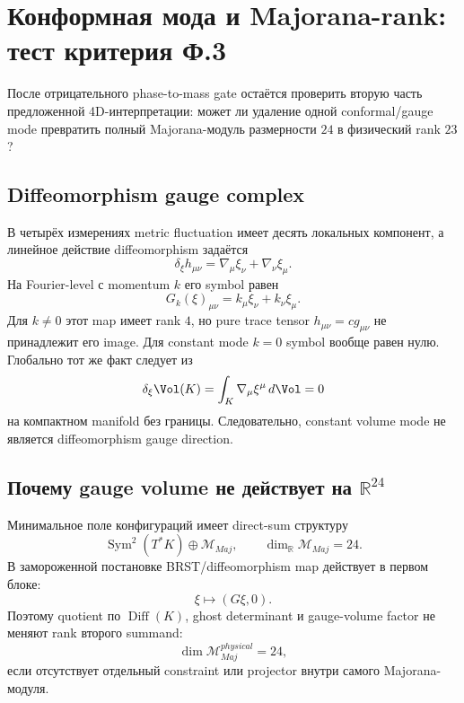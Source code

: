\chapter{Конформная мода и Majorana-rank: тест критерия Ф.3}

После отрицательного phase-to-mass gate остаётся проверить вторую часть
предложенной 4D-интерпретации: может ли удаление одной conformal/gauge mode
превратить полный Majorana-модуль размерности \(24\) в физический rank \(23\)?

\section{Diffeomorphism gauge complex}

В четырёх измерениях metric fluctuation имеет десять локальных компонент,
а линейное действие diffeomorphism задаётся
\begin{equation}
 \delta_\xi h_{\mu\nu}=\nabla_\mu\xi_\nu+\nabla_\nu\xi_\mu.
\end{equation}
На Fourier-level с momentum \(k\) его symbol равен
\begin{equation}
 G_k(\xi)_{\mu\nu}=k_\mu\xi_\nu+k_\nu\xi_\mu.
\end{equation}
Для \(k\neq0\) этот map имеет rank \(4\), но pure trace tensor
\(h_{\mu\nu}=c g_{\mu\nu}\) не принадлежит его image. Для constant mode
\(k=0\) symbol вообще равен нулю. Глобально тот же факт следует из
\begin{equation}
 \delta_\xi\Vol(K)
 =\int_K\nabla_\mu\xi^\mu\,d\Vol=0
\end{equation}
на компактном manifold без границы. Следовательно, constant volume mode не
является diffeomorphism gauge direction.

\section{Почему gauge volume не действует на \texorpdfstring{\(\mathbb R^{24}\)}{R24}}

Минимальное поле конфигураций имеет direct-sum структуру
\begin{equation}
 \operatorname{Sym}^2(T^*K)\oplus\mathcal M_{Maj},
 \qquad \dim_{\mathbb R}\mathcal M_{Maj}=24.
\end{equation}
В замороженной постановке BRST/diffeomorphism map действует в первом блоке:
\begin{equation}
 \xi\longmapsto(G\xi,0).
\end{equation}
Поэтому quotient по \(\operatorname{Diff}(K)\), ghost determinant и
gauge-volume factor не меняют rank второго summand:
\begin{equation}
 \dim\mathcal M_{Maj}^{physical}=24,
\end{equation}
если отсутствует отдельный constraint или projector внутри самого
Majorana-модуля.

